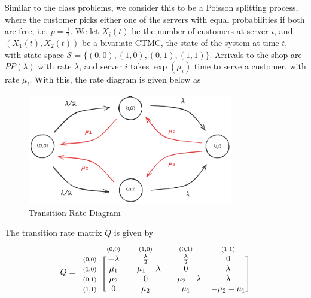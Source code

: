 \documentclass[12pt]{article}
\newcommand{\matindex}[1]{\mbox{\scriptsize#1}}%
\begin{document}
Similar to the class problems, we consider this to be a Poisson splitting process, where the customer picks either one of the servers with equal probabilities if both are free, i.e. $p = \frac{1}{2}$. We let $X_i(t)$ be the number of customers at server $i$, and $\left( X_1(t), X_2(t) \right)$ be a bivariate CTMC, the state of the system at time $t$, with state space $\mathcal{S} = \{(0,0), (1,0), (0,1), (1,1)\}$. Arrivals to the shop are $PP(\lambda)$ with rate $\lambda$, and server $i$ takes $\exp (\mu_i)$ time to serve a customer, with rate $\mu_i$. With this, the rate diagram is given below as 

\begin{figure}[H]
    \centering
    \includegraphics[width=0.8\textwidth]{Images/Q4.png}
    \caption{Transition Rate Diagram}
    \label{fig:4-diag}
\end{figure} 

\noindent The transition rate matrix $Q$ is given by \begin{equation}
    Q = \begin{blockarray}{ccccc}
        & \matindex{(0,0)} & \matindex{(1,0)} &\matindex{(0,1)} &\matindex{(1,1)} \\
        \begin{block}{c[cccc]}
            \matindex{(0,0)} & -\lambda & \frac{\lambda}{2} & \frac{\lambda}{2} & 0 \\
            \matindex{(1,0)} & \mu_1 & -\mu_{1}-\lambda  & 0 & \lambda \\
            \matindex{(0,1)} & \mu_2 & 0 & -\mu_{2}-\lambda & \lambda \\
            \matindex{(1,1)} & 0 & \mu_2 & \mu_1 & -\mu_{2}-\mu_1 \\
        \end{block}
    \end{blockarray}
\end{equation}

\newpage
\end{document}
